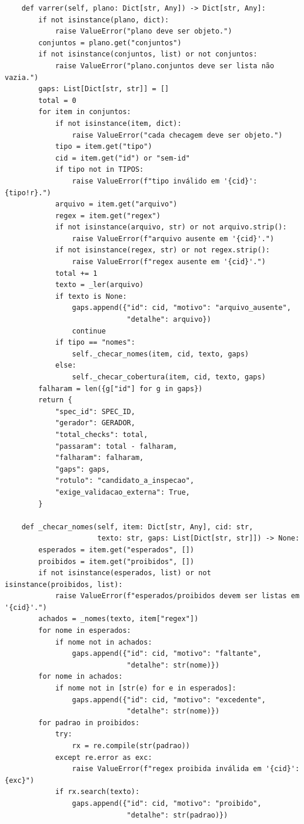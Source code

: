 \documentclass[12pt,openany,oneside,a4paper,brazil,chapter=TITLE]{abntex2}
\begin{document}
\begin{lstlisting}
    def varrer(self, plano: Dict[str, Any]) -> Dict[str, Any]:
        if not isinstance(plano, dict):
            raise ValueError("plano deve ser objeto.")
        conjuntos = plano.get("conjuntos")
        if not isinstance(conjuntos, list) or not conjuntos:
            raise ValueError("plano.conjuntos deve ser lista não vazia.")
        gaps: List[Dict[str, str]] = []
        total = 0
        for item in conjuntos:
            if not isinstance(item, dict):
                raise ValueError("cada checagem deve ser objeto.")
            tipo = item.get("tipo")
            cid = item.get("id") or "sem-id"
            if tipo not in TIPOS:
                raise ValueError(f"tipo inválido em '{cid}': {tipo!r}.")
            arquivo = item.get("arquivo")
            regex = item.get("regex")
            if not isinstance(arquivo, str) or not arquivo.strip():
                raise ValueError(f"arquivo ausente em '{cid}'.")
            if not isinstance(regex, str) or not regex.strip():
                raise ValueError(f"regex ausente em '{cid}'.")
            total += 1
            texto = _ler(arquivo)
            if texto is None:
                gaps.append({"id": cid, "motivo": "arquivo_ausente",
                             "detalhe": arquivo})
                continue
            if tipo == "nomes":
                self._checar_nomes(item, cid, texto, gaps)
            else:
                self._checar_cobertura(item, cid, texto, gaps)
        falharam = len({g["id"] for g in gaps})
        return {
            "spec_id": SPEC_ID,
            "gerador": GERADOR,
            "total_checks": total,
            "passaram": total - falharam,
            "falharam": falharam,
            "gaps": gaps,
            "rotulo": "candidato_a_inspecao",
            "exige_validacao_externa": True,
        }

    def _checar_nomes(self, item: Dict[str, Any], cid: str,
                      texto: str, gaps: List[Dict[str, str]]) -> None:
        esperados = item.get("esperados", [])
        proibidos = item.get("proibidos", [])
        if not isinstance(esperados, list) or not isinstance(proibidos, list):
            raise ValueError(f"esperados/proibidos devem ser listas em '{cid}'.")
        achados = _nomes(texto, item["regex"])
        for nome in esperados:
            if nome not in achados:
                gaps.append({"id": cid, "motivo": "faltante",
                             "detalhe": str(nome)})
        for nome in achados:
            if nome not in [str(e) for e in esperados]:
                gaps.append({"id": cid, "motivo": "excedente",
                             "detalhe": str(nome)})
        for padrao in proibidos:
            try:
                rx = re.compile(str(padrao))
            except re.error as exc:
                raise ValueError(f"regex proibida inválida em '{cid}': {exc}")
            if rx.search(texto):
                gaps.append({"id": cid, "motivo": "proibido",
                             "detalhe": str(padrao)})


\end{lstlisting}
\end{document}

